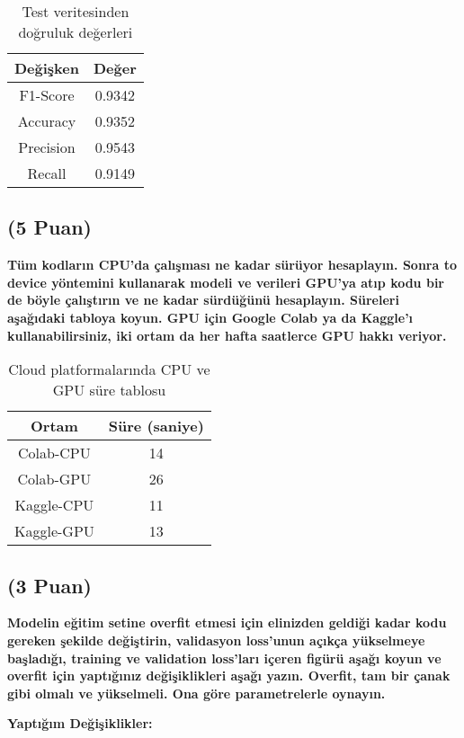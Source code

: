 \documentclass[11pt]{article}
\begin{document}
\begin{table}[ht!]
    \centering
    \caption{Test veritesinden doğruluk değerleri}
    \begin{tabular}{c|c}
        Değişken & Değer\\\hline
        F1-Score & 0.9342 \\
        Accuracy & 0.9352\\
        Precision & 0.9543\\
        Recall & 0.9149\\
    \end{tabular}
\end{table}


\newpage
\subsection{(5 Puan)} \textbf{Tüm kodların CPU'da çalışması ne kadar sürüyor hesaplayın. Sonra to device yöntemini kullanarak modeli ve verileri GPU'ya atıp kodu bir de böyle çalıştırın ve ne kadar sürdüğünü hesaplayın. Süreleri aşağıdaki tabloya koyun. GPU için Google Colab ya da Kaggle'ı kullanabilirsiniz, iki ortam da her hafta saatlerce GPU hakkı veriyor.}

\begin{table}[ht!]
    \centering
    \caption{Cloud platformalarında CPU ve GPU süre tablosu}
    \begin{tabular}{c|c}
        Ortam & Süre (saniye) \\\hline
        Colab-CPU & 14 \\
        Colab-GPU & 26\\
        Kaggle-CPU & 11\\
        Kaggle-GPU & 13\\
    \end{tabular}
\end{table}

\subsection{(3 Puan)} \textbf{Modelin eğitim setine overfit etmesi için elinizden geldiği kadar kodu gereken şekilde değiştirin, validasyon loss'unun açıkça yükselmeye başladığı, training ve validation loss'ları içeren figürü aşağı koyun ve overfit için yaptığınız değişiklikleri aşağı yazın. Overfit, tam bir çanak gibi olmalı ve yükselmeli. Ona göre parametrelerle oynayın.}

\textbf{Yaptığım Değişiklikler:}
\end{document}
